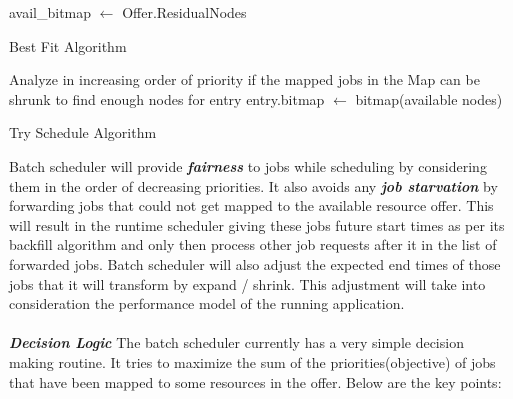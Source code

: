 \setcounter{AlgoLine}{0}
\begin{algorithm}[!htbp]
 \DontPrintSemicolon
 avail\_bitmap $\leftarrow$ Offer.ResidualNodes\;
 \caption{Best Fit Algorithm}
 \label{algo:2}
\end{algorithm}
\setcounter{AlgoLine}{0}
\begin{algorithm}[!htbp]
 \DontPrintSemicolon
 Analyze in increasing order of priority if the mapped jobs in the Map can be shrunk to find enough nodes for entry\;
 entry.bitmap $\leftarrow$ bitmap(available nodes)\;
 \caption{Try Schedule Algorithm}
 \label{algo:3}
\end{algorithm}
\setcounter{AlgoLine}{0}
Batch scheduler will provide \textbf{\textit{fairness}} to jobs while scheduling by considering them in the order of decreasing priorities. It also avoids any \textbf{\textit{job starvation}} by forwarding jobs that could not get mapped to the available resource offer. This will result in the runtime scheduler giving these jobs future start times as per its backfill algorithm and only then process other job requests after it  in the list of forwarded jobs. Batch scheduler will also adjust the expected end times of those jobs that it will transform by expand / shrink. This adjustment will take into consideration the performance model of the running application.\\ \\
\textbf{\textit{Decision Logic}} The batch scheduler currently has a very simple decision making routine. It tries to maximize the sum of the priorities(objective) of jobs that have been mapped to some resources in the offer. Below are the key points:
